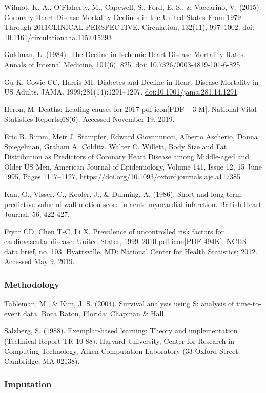 \documentclass[
]{article}
\begin{document}
Wilmot, K. A., O'Flaherty, M., Capewell, S., Ford, E. S., \& Vaccarino,
V. (2015). Coronary Heart Disease Mortality Declines in the United
States From 1979 Through 2011CLINICAL PERSPECTIVE. Circulation, 132(11),
997--1002. doi: 10.1161/circulationaha.115.015293

Goldman, L. (1984). The Decline in Ischemic Heart Disease Mortality
Rates. Annals of Internal Medicine, 101(6), 825. doi:
10.7326/0003-4819-101-6-825

Gu K, Cowie CC, Harris MI. Diabetes and Decline in Heart Disease
Mortality in US Adults. JAMA. 1999;281(14):1291--1297.
\url{doi:10.1001/jama.281.14.1291}

Heron, M. Deaths: Leading causes for 2017 pdf icon{[}PDF -- 3 M{]}.
National Vital Statistics Reports;68(6). Accessed November 19, 2019.

Eric B. Rimm, Meir J. Stampfer, Edward Giovannucci, Alberto Ascherio,
Donna Spiegelman, Graham A. Colditz, Walter C. Willett, Body Size and
Fat Distribution as Predictors of Coronary Heart Disease among
Middle-aged and Older US Men, American Journal of Epidemiology, Volume
141, Issue 12, 15 June 1995, Pages 1117--1127,
\url{https://doi.org/10.1093/oxfordjournals.aje.a117385}

Kan, G., Visser, C., Kooler, J., \& Dunning, A. (1986). Short and long
term predictive value of wall motion score in acute myocardial
infarction. British Heart Journal, 56, 422-427.

Fryar CD, Chen T-C, Li X. Prevalence of uncontrolled risk factors for
cardiovascular disease: United States, 1999--2010 pdf
icon{[}PDF-494K{]}. NCHS data brief, no. 103. Hyattsville, MD: National
Center for Health Statistics; 2012. Accessed May 9, 2019.

\hypertarget{methodology-1}{%
\subsubsection{Methodology}\label{methodology-1}}

Tableman, M., \& Kim, J. S. (2004). Survival analysis using S: analysis
of time-to-event data. Boca Raton, Florida: Chapman \& Hall.

Salzberg, S. (1988). Exemplar-based learning: Theory and implementation
(Technical Report TR-10-88). Harvard University, Center for Research in
Computing Technology, Aiken Computation Laboratory (33 Oxford Street;
Cambridge, MA 02138).

\hypertarget{imputation-1}{%
\subsubsection{Imputation}\label{imputation-1}}
\end{document}
